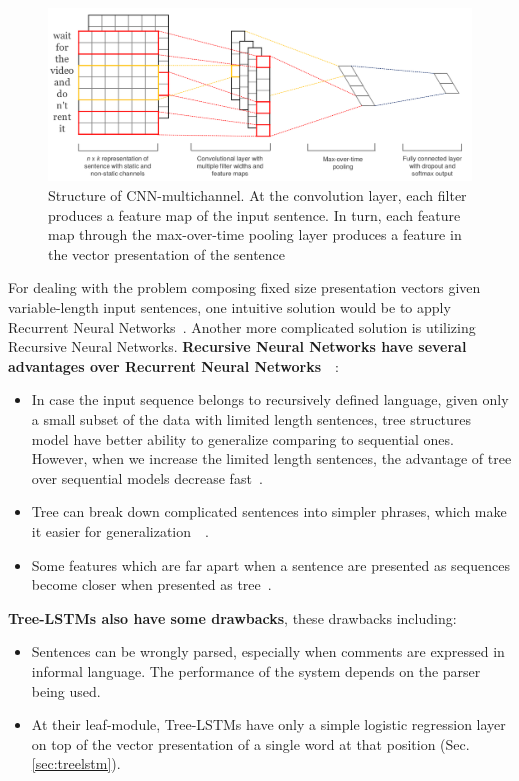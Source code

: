 \begin{figure}[H]
    \centering
    \includegraphics[scale=0.33]{figure/sentencecnn}
    \caption[CNN-multichannel]{Structure of CNN-multichannel.
    At the convolution layer, each filter produces a feature map of the input sentence.
    In turn, each feature map through the max-over-time pooling layer produces a feature in the vector presentation of the sentence}
    \label{fig:CNN-multichannel}
\end{figure}

For dealing with the problem composing fixed size presentation vectors given variable-length input sentences, one intuitive solution would be to apply Recurrent Neural Networks~\cite{cnn-rnn}.
Another more complicated solution is utilizing Recursive Neural Networks.
\textbf{Recursive Neural Networks have several advantages over Recurrent Neural Networks}~\cite{need-tree}~\cite{bowman-treevslstm}:
\begin{itemize}
\item In case the input sequence belongs to recursively defined language, given only a small subset of the data with limited length sentences, tree structures model have better ability to generalize comparing to sequential ones.
However, when we increase the limited length sentences, the advantage of tree over sequential models decrease fast~\cite{bowman-treevslstm}.
\item Tree can break down complicated sentences into simpler phrases, which make it easier for generalization~\cite{knowledge-matter}~\cite{need-tree}.
\item Some features which are far apart when a sentence are presented as sequences become closer when presented as tree~\cite{need-tree}.
\end{itemize}

\textbf{Tree-LSTMs also have some drawbacks}, these drawbacks including:
\begin{itemize}
\item Sentences can be wrongly parsed, especially when comments are expressed in informal language.
The performance of the system depends on the parser being used.
\item At their leaf-module, Tree-LSTMs have only a simple logistic regression layer on top of the vector presentation of a single word at that position (Sec.\ref{sec:treelstm}).
\end{itemize}

